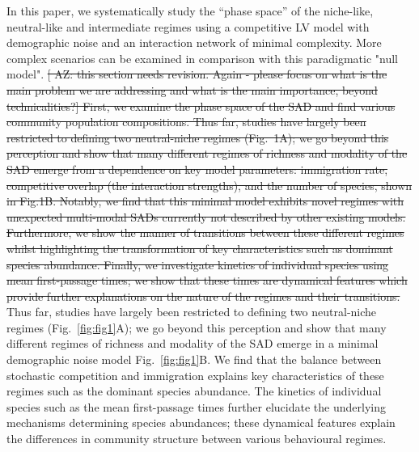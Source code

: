 \documentclass[9pt,twocolumn,twoside,lineno]{pnas-new}
\begin{document}
In this paper, we systematically study the ``phase space'' of the niche-like, neutral-like and intermediate regimes using a competitive LV model with demographic noise and an interaction network of minimal complexity. 
More complex scenarios can be examined in comparison with this paradigmatic "null model".%
\st{ [ AZ: this section needs revision. Again - please focus on what is the main problem we are addressing and what is the main importance, beyond technicalities?] 
First, we examine the phase space of the SAD and find various community population compositions. 
Thus far, studies have largely been restricted to defining two neutral-niche regimes (Fig.~1A); we go beyond this perception and show that many different regimes of richness and modality of the SAD emerge from a dependence on key model parameters: immigration rate, competitive overlap (the interaction strengths), and the number of species, shown in Fig.1B.
Notably, we find that this minimal model exhibits novel regimes with unexpected multi-modal SADs currently not described by other existing models.
Furthermore, we show the manner of transitions between these different regimes whilst highlighting the transformation of key characteristics such as dominant species abundance. %
Finally, we investigate kinetics of individual species using mean first-passage times; we show that these times are dynamical features which provide further explanations on the nature of the regimes and their transitions.}
Thus far, studies have largely been restricted to defining two neutral-niche regimes (Fig.~\ref{fig:fig1}A); we go beyond this perception and show that many different regimes of richness and modality of the SAD emerge in a minimal demographic noise model Fig.~\ref{fig:fig1}B.
We find that the balance between stochastic competition and immigration explains key characteristics of these regimes such as the dominant species abundance. %
The kinetics of individual species such as the mean first-passage times further elucidate the underlying mechanisms determining species abundances; these dynamical features explain the differences in community structure between various behavioural regimes.
\end{document}
